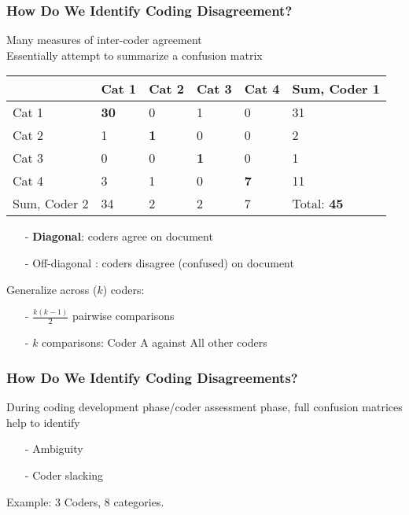 \documentclass{beamer}
\numberwithin{equation}{section}
\begin{document}
\begin{frame}
\frametitle{How Do We Identify Coding Disagreement?}

\alert{Many} measures of inter-coder agreement\\
Essentially attempt to summarize a \alert{confusion} matrix\\

\begin{tabular}{l|l|l|l|l||l}
\hline
 & Cat 1& Cat 2 & Cat 3 & Cat 4  & Sum, Coder 1\\
 \hline
 Cat 1 &  \textbf{30}  & 0      &  \alert{1}          & 0         &       31             \\
 \hline
 Cat 2 & 1   &     \textbf{1}  &      0       &   0        &  2     \\
 \hline
 Cat 3&  0  &   0    &  \textbf{1}           &   0        & 1       \\
 \hline
 Cat 4  &  \alert{3}  &  1   &  0      &  \textbf{7}    &   11                \\
 \hline\hline
 Sum, Coder 2& 34   &  2     &  2          &   7        &     Total: \textbf{45}    \\
 \hline
\end{tabular}

\begin{itemize}
\item[-] \textbf{Diagonal}: coders agree on document
\item[-] \alert{Off-diagonal} : coders disagree (confused) on document
\end{itemize}


\alert{Generalize} across ($k$) coders:
\begin{itemize}
\item[-]  $\frac{k (k-1) }{2} $ pairwise comparisons
\item[-] $k$ comparisons: Coder A against All other coders
\end{itemize}

\end{frame}


\begin{frame}
\frametitle{How Do We Identify Coding Disagreements?}

During coding development phase/coder assessment phase, \alert{full} confusion matrices help to identify
\begin{itemize}
\item[-] Ambiguity
\item[-] Coder slacking
\end{itemize}
Example: 3 Coders, 8 categories.


\end{frame}
\end{document}
